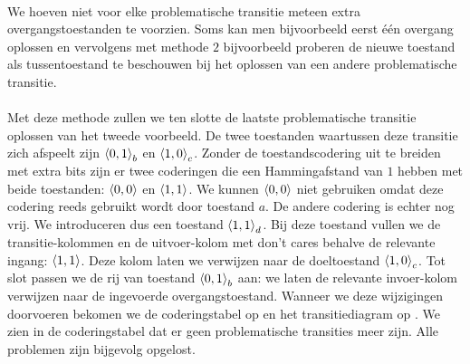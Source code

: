 \paragraph{}
We hoeven niet voor elke problematische transitie meteen extra overgangstoestanden te voorzien. Soms kan men bijvoorbeeld eerst \'e\'en overgang oplossen en vervolgens met methode $2$ bijvoorbeeld proberen de nieuwe toestand als tussentoestand te beschouwen bij het oplossen van een andere problematische transitie.
\paragraph{}
Met deze methode zullen we ten slotte de laatste problematische transitie oplossen van het tweede voorbeeld. De twee toestanden waartussen deze transitie zich afspeelt zijn $\left\langle 0,1 \right\rangle_b$ en $\left\langle 1,0 \right\rangle_c$. Zonder de toestandscodering uit te breiden met extra bits zijn er twee coderingen die een Hammingafstand van $1$ hebben met beide toestanden: $\left\langle 0,0 \right\rangle$ en $\left\langle 1,1 \right\rangle$. We kunnen $\left\langle 0,0 \right\rangle$ niet gebruiken omdat deze codering reeds gebruikt wordt door toestand $a$. De andere codering is echter nog vrij. We introduceren dus een toestand $\left\langle 1,1 \right\rangle_d$. Bij deze toestand vullen we de transitie-kolommen en de uitvoer-kolom met don't cares behalve de relevante ingang: $\left\langle 1,1 \right\rangle$. Deze kolom laten we verwijzen naar de doeltoestand $\left\langle 1,0 \right\rangle_c$. Tot slot passen we de rij van toestand $\left\langle 0,1 \right\rangle_b$ aan: we laten de relevante invoer-kolom verwijzen naar de ingevoerde overgangstoestand. Wanneer we deze wijzigingen doorvoeren bekomen we de coderingstabel op  en het transitiediagram op . We zien in de coderingstabel dat er geen problematische transities meer zijn. Alle problemen zijn bijgevolg opgelost.
